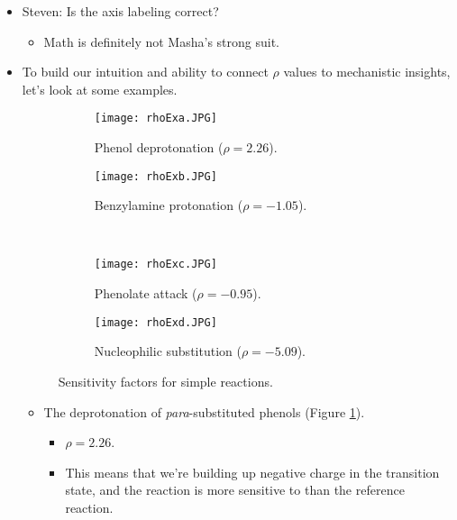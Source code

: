 \documentclass[../notes.tex]{subfiles}
\begin{document}
\begin{itemize}
\begin{itemize}
    \end{itemize}
    \item Steven: Is the axis labeling correct?
    \begin{itemize}
        \item Math is definitely not Masha's strong suit.
    \end{itemize}
    \item To build our intuition and ability to connect $\rho$ values to mechanistic insights, let's look at some examples.
    \begin{figure}[h!]
        \centering
        \begin{subfigure}[b]{0.49\linewidth}
            \centering
            \texttt{[image: rhoExa.JPG]}
            \caption{Phenol deprotonation ($\rho=2.26$).}
            \label{fig:rhoExa}
        \end{subfigure}
        \begin{subfigure}[b]{0.49\linewidth}
            \centering
            \texttt{[image: rhoExb.JPG]}
            \caption{Benzylamine protonation ($\rho=-1.05$).}
            \label{fig:rhoExb}
        \end{subfigure}\\[2em]
        \begin{subfigure}[b]{0.49\linewidth}
            \centering
            \texttt{[image: rhoExc.JPG]}
            \caption{Phenolate attack ($\rho=-0.95$).}
            \label{fig:rhoExc}
        \end{subfigure}
        \begin{subfigure}[b]{0.49\linewidth}
            \centering
            \texttt{[image: rhoExd.JPG]}
            \caption{Nucleophilic substitution ($\rho=-5.09$).}
            \label{fig:rhoExd}
        \end{subfigure}
        \caption{Sensitivity factors for simple reactions.}
        \label{fig:rhoEx}
    \end{figure}
    \begin{itemize}
        \item The deprotonation of \emph{para}-substituted phenols (Figure \ref{fig:rhoExa}).
        \begin{itemize}
            \item $\rho=2.26$.
            \item This means that we're building up negative charge in the transition state, and the reaction is more sensitive to  than the reference reaction.

\end{itemize}
\end{itemize}
\end{itemize}
\end{document}
